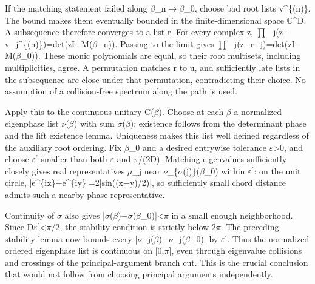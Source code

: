 \documentclass[11pt,a4paper]{article}
\begin{document}
If the matching statement failed along \ensuremath{\beta}\_n\ensuremath{\to}\ensuremath{\beta}\_0, choose bad root lists v\textasciicircum{}\{(n)\}. The bound makes them eventually bounded in the finite-dimensional space \ensuremath{\mathbb{C}}\textasciicircum{}D. A subsequence therefore converges to a list r. For every complex z, \ensuremath{\prod}\_j(z\ensuremath{-}v\_j\textasciicircum{}\{(n)\})=det(zI\ensuremath{-}M(\ensuremath{\beta}\_n)). Passing to the limit gives \ensuremath{\prod}\_j(z\ensuremath{-}r\_j)=det(zI\ensuremath{-}M(\ensuremath{\beta}\_0)). These monic polynomials are equal, so their root multisets, including multiplicities, agree. A permutation matches r to u, and sufficiently late lists in the subsequence are close under that permutation, contradicting their choice. No assumption of a collision-free spectrum along the path is used.

Apply this to the continuous unitary C(\ensuremath{\beta}). Choose at each \ensuremath{\beta} a normalized eigenphase list \ensuremath{\nu}(\ensuremath{\beta}) with sum \ensuremath{\sigma}(\ensuremath{\beta}); existence follows from the determinant phase and the lift existence lemma. Uniqueness makes this list well defined regardless of the auxiliary root ordering. Fix \ensuremath{\beta}\_0 and a desired entrywise tolerance \ensuremath{\varepsilon}>0, and choose \ensuremath{\varepsilon}\ensuremath{^{\prime}} smaller than both \ensuremath{\varepsilon} and \ensuremath{\pi}/(2D). Matching eigenvalues sufficiently closely gives real representatives \ensuremath{\mu}\_j near \ensuremath{\nu}\_\{\ensuremath{\sigma}(j)\}(\ensuremath{\beta}\_0) within \ensuremath{\varepsilon}\ensuremath{^{\prime}}: on the unit circle, |e\textasciicircum{}\{ix\}\ensuremath{-}e\textasciicircum{}\{iy\}|=2|sin((x\ensuremath{-}y)/2)|, so sufficiently small chord distance admits such a nearby phase representative.

Continuity of \ensuremath{\sigma} also gives |\ensuremath{\sigma}(\ensuremath{\beta})\ensuremath{-}\ensuremath{\sigma}(\ensuremath{\beta}\_0)|<\ensuremath{\pi} in a small enough neighborhood. Since D\ensuremath{\varepsilon}\ensuremath{^{\prime}}<\ensuremath{\pi}/2, the stability condition is strictly below 2\ensuremath{\pi}. The preceding stability lemma now bounds every |\ensuremath{\nu}\_j(\ensuremath{\beta})\ensuremath{-}\ensuremath{\nu}\_j(\ensuremath{\beta}\_0)| by \ensuremath{\varepsilon}\ensuremath{^{\prime}}. Thus the normalized ordered eigenphase list is continuous on [0,\ensuremath{\pi}], even through eigenvalue collisions and crossings of the principal-argument branch cut. This is the crucial conclusion that would not follow from choosing principal arguments independently.
\end{document}
